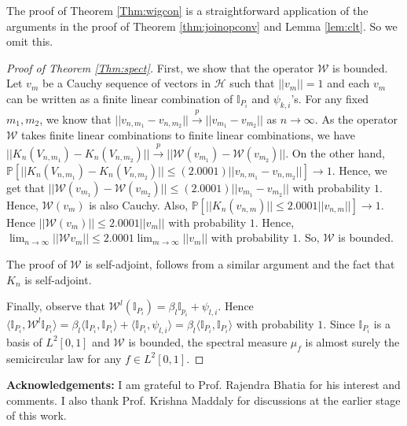 \documentclass[reqno,12pt]{amsart}
\theoremstyle{plain}
\theoremstyle{definition}
\begin{document}
\noindent 
The proof of Theorem \ref{Thm:wigcon} is a straightforward application of the arguments in the proof of Theorem \ref{thm:joinopconv} and Lemma \ref{lem:clt}. So we omit this.
\begin{proof}[Proof of Theorem \ref{Thm:spect}]
    First, we show that the operator $\mathcal{W}$ is bounded. Let $v_{m}$ be a Cauchy sequence of vectors in $\mathcal{H}$ such that $||v_{m}||=1$ and each $v_{m}$ can be written as a finite linear combination of $\mathbb{I}_{P_{i}}$ and $\psi_{k,i}$'s. For any fixed $m_{1},m_{2}$, we know that $||v_{n,m_{1}}- v_{n,m_{2}}|| \stackrel{p}{\to}||v_{m_{1}}-v_{m_{2}}||$ as $n \to \infty$. As the operator $\mathcal{W}$ takes finite linear combinations to finite linear combinations, we have $||K_{n}(V_{n,m_{1}})-K_{n}(V_{n,m_{2}})|| \stackrel{p}{\to} ||\mathcal{W}(v_{m_{1}})-\mathcal{W}(v_{m_{2}})||$. On the other hand, $\mathbb{P}\left[ ||K_{n}(V_{n,m_{1}})-K_{n}(V_{n,m_{2}})|| \le (2.0001) ||v_{n,m_{1}}-v_{n,m_{2}}|| \right]\to 1$. Hence, we get that $||\mathcal{W}(v_{m_{1}})-\mathcal{W}(v_{m_{2}})|| \le (2.0001)||v_{m_{1}}-v_{m_{2}}||$ with probability $1$. Hence, $\mathcal{W}(v_{m})$ is also Cauchy. Also, $\mathbb{P}\left[ ||K_{n}(v_{n,m})||\le 2.0001||v_{n,m}||  \right] \to 1$. Hence $||\mathcal{W}(v_{m})||\le 2.0001 ||v_{m}||$ with probability $1$. Hence, $\lim_{n\to \infty}||\mathcal{W}v_{m}||\le 2.0001 \lim_{m \to \infty} ||v_{m}||$ with probability $1$. So, $\mathcal{W}$ is bounded.

    \noindent 
    The proof of $\mathcal{W}$ is self-adjoint, follows from a similar argument and the fact that $K_{n}$ is self-adjoint.

    \noindent 
    Finally, observe that $\mathcal{W}^{l}(\mathbb{I}_{P_{i}})= \beta_{l}\mathbb{I}_{p_{i}}+ \psi_{l,i}.$ Hence $\langle \mathbb{I}_{P_{i}}, \mathcal{W}^{l} \mathbb{I}_{P_{i}}  \rangle = \beta_{l}\langle \mathbb{I}_{P_{i}}, \mathbb{I}_{P_{i}}\rangle + \langle \mathbb{I}_{P_{i}}, \psi_{l,i}\rangle= \beta_{l}\langle \mathbb{I}_{P_{i}}, \mathbb{I}_{P_{i}}\rangle$ with probability $1$. Since $\mathbb{I}_{P_{i}}$ is a basis of $L^{2}[0,1]$ and $\mathcal{W}$ is bounded, the spectral measure $\mu_{f}$ is almost surely the semicircular law for any $f \in L^2[0,1]$.
\end{proof}
\textbf{Acknowledgements:} I am grateful to Prof. Rajendra Bhatia for his interest and comments. I also thank Prof. Krishna Maddaly for discussions at the earlier stage of this work. 


\end{document}
